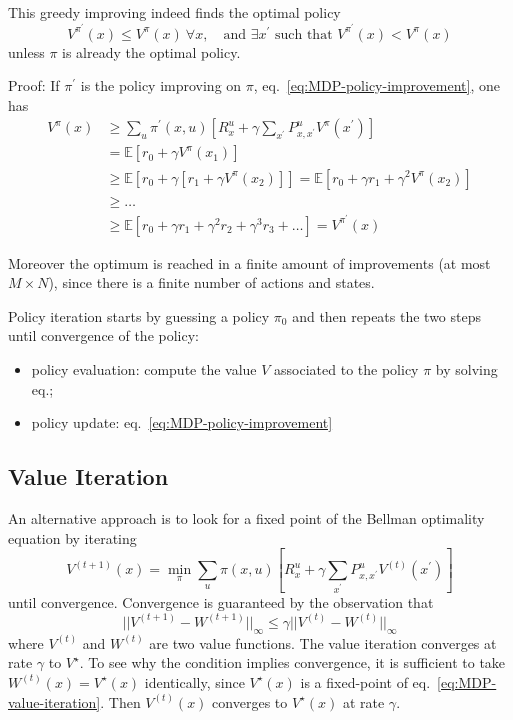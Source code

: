 This greedy improving indeed finds the optimal policy
\begin{equation*}
  V^{\pi^\prime}(x) \le V^\pi(x)\ \forall x,\quad \text{and }\exists x^\prime \text{ such that }V^{\pi^\prime}(x) < V^\pi(x)
\end{equation*}
unless $\pi$ is already the optimal policy.

Proof:
If $\pi^\prime$ is the policy improving on $\pi$, eq.~\eqref{eq:MDP-policy-improvement}, one has
\begin{align*}
  V^\pi(x) &\ge \sum_u \pi^\prime(x,u)\left[R^u_x + \gamma \sum_{x^\prime}P^u_{x,x^\prime} V^\pi(x^\prime)\right] \\
           &= \mathbb{E} \left[r_0 + \gamma V^\pi(x_1)\right] \\
           &\ge \mathbb{E} \left[r_0 + \gamma \left[r_1 + \gamma V^\pi(x_2)\right]\right] = \mathbb{E} \left[r_0 + \gamma r_1 + \gamma^2 V^\pi(x_2)\right] \\
  &\ge \ldots \\
  &\ge \mathbb{E} \left[r_0 + \gamma r_1 + \gamma^2 r_2 + \gamma^3 r_3 + \ldots \right] = V^{\pi^\prime}(x)
\end{align*}

Moreover the optimum is reached in a finite amount of improvements (at most $M\times N$), since there is a finite number of actions and states.

Policy iteration starts by guessing a policy $\pi_0$ and then repeats the two steps until convergence of the policy:
\begin{itemize}
\item policy evaluation: compute the value $V$ associated to the policy $\pi$ by solving eq.;
\item policy update: eq.~\eqref{eq:MDP-policy-improvement}
\end{itemize}


\subsection{Value Iteration}
\label{sec:MDP-value-iteration}

An alternative approach is to look for a fixed point of the Bellman optimality equation by iterating
\begin{equation}
  \label{eq:MDP-value-iteration}
  V^{(t+1)}(x) = \min_\pi  \sum_u \pi(x,u)\left[R^u_x + \gamma \sum_{x^\prime}P^u_{x,x^\prime} V^{(t)}(x^\prime)\right]
\end{equation}
until convergence. Convergence is guaranteed by the observation that
\begin{equation*}
  ||V^{(t+1)}-W^{(t+1)}||_\infty \le \gamma ||V^{(t)}-W^{(t)}||_\infty
\end{equation*}
where $V^{(t)}$ and $W^{(t)}$ are two value functions. The value iteration converges at rate $\gamma$ to $V^\star$. To see why the condition implies convergence, it is sufficient to take $W^{(t)}(x) = V^\star(x)$ identically, since $V^\star(x)$ is a fixed-point of eq.~\eqref{eq:MDP-value-iteration}. Then $V^{(t)}(x)$ converges to $V^\star(x)$ at rate $\gamma$.

